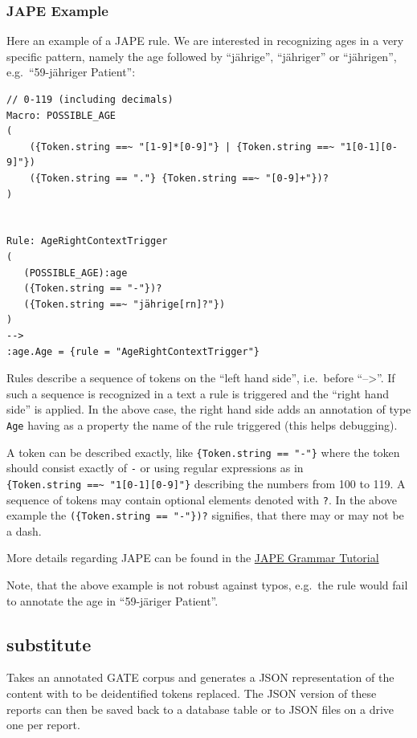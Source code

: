 \subsubsection{JAPE Example}\label{jape-example}

Here an example of a JAPE rule. We are interested in recognizing ages in
a very specific pattern, namely the age followed by ``jährige'',
``jähriger'' or ``jährigen'', e.g.~``59-jähriger Patient'':

\begin{verbatim}
// 0-119 (including decimals)
Macro: POSSIBLE_AGE
(
    ({Token.string ==~ "[1-9]*[0-9]"} | {Token.string ==~ "1[0-1][0-9]"})
    ({Token.string == "."} {Token.string ==~ "[0-9]+"})?
)


Rule: AgeRightContextTrigger
(
   (POSSIBLE_AGE):age
   ({Token.string == "-"})?
   ({Token.string ==~ "jährige[rn]?"})
)
-->
:age.Age = {rule = "AgeRightContextTrigger"}
\end{verbatim}

Rules describe a sequence of tokens on the ``left hand side'',
i.e.~before ``--\textgreater{}''. If such a sequence is recognized in a
text a rule is triggered and the ``right hand side'' is applied. In the
above case, the right hand side adds an annotation of type \texttt{Age}
having as a property the name of the rule triggered (this helps
debugging).

A token can be described exactly, like
\texttt{\{Token.string\ ==\ "-"\}} where the token should consist
exactly of \texttt{-} or using regular expressions as in
\texttt{\{Token.string\ ==\textasciitilde{}\ "1{[}0-1{]}{[}0-9{]}"\}}
describing the numbers from 100 to 119. A sequence of tokens may contain
optional elements denoted with \texttt{?}. In the above example the
\texttt{(\{Token.string\ ==\ "-"\})?} signifies, that there may or may
not be a dash.

More details regarding JAPE can be found in the
\href{https://gate.ac.uk/sale/thakker-jape-tutorial/GATE\%20JAPE\%20manual.pdf}{JAPE
Grammar Tutorial}

Note, that the above example is not robust against typos, e.g.~the rule
would fail to annotate the age in ``59-järiger Patient''.

\subsection{substitute}\label{substitute}

Takes an annotated GATE corpus and generates a JSON representation of
the content with to be deidentified tokens replaced. The JSON version of
these reports can then be saved back to a database table or to JSON
files on a drive one per report.

